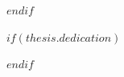 \clearpage


$endif$

$if(thesis.dedication)$

\dedicatory{} 

$endif$


\mainmatter %

\pagestyle{thesis} %
